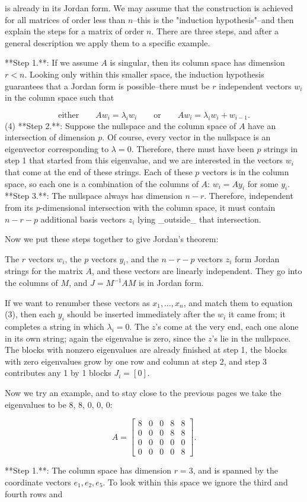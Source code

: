 is already in its Jordan form. We may assume that the construction is achieved for all matrices of order less than \(n\)--this is the "induction hypothesis"--and then explain the steps for a matrix of order \(n\). There are three steps, and after a general description we apply them to a specific example.

**Step 1.**: If we assume \(A\) is singular, then its column space has dimension \(r<n\). Looking only within this smaller space, the induction hypothesis guarantees that a Jordan form is possible--there must be \(r\) independent vectors \(w_{i}\) in the column space such that

\[\text{either}\qquad Aw_{i}=\lambda_{i}w_{i}\qquad\text{or}\qquad Aw_{i}= \lambda_{i}w_{i}+w_{i-1}.\] (4)
**Step 2.**: Suppose the nullspace and the column space of \(A\) have an intersection of dimension \(p\). Of course, every vector in the nullspace is an eigenvector corresponding to \(\lambda=0\). Therefore, there must have been \(p\) strings in step 1 that started from this eigenvalue, and we are interested in the vectors \(w_{i}\) that come at the end of these strings. Each of these \(p\) vectors is in the column space, so each one is a combination of the columns of \(A\): \(w_{i}=Ay_{i}\) for some \(y_{i}\).
**Step 3.**: The nullspace always has dimension \(n-r\). Therefore, independent from its \(p\)-dimensional intersection with the column space, it must contain \(n-r-p\) additional basis vectors \(z_{i}\) lying _outside_ that intersection.

Now we put these steps together to give Jordan's theorem:

The \(r\) vectors \(w_{i}\), the \(p\) vectors \(y_{i}\), and the \(n-r-p\) vectors \(z_{i}\) form Jordan strings for the matrix \(A\), and these vectors are linearly independent. They go into the columns of \(M\), and \(J=M^{-1}AM\) is in Jordan form.

If we want to renumber these vectors as \(x_{1},\ldots,x_{n}\), and match them to equation (3), then each \(y_{i}\) should be inserted immediately after the \(w_{i}\) it came from; it completes a string in which \(\lambda_{i}=0\). The \(z\)'s come at the very end, each one alone in its own string; again the eigenvalue is zero, since the \(z\)'s lie in the nullspace. The blocks with nonzero eigenvalues are already finished at step 1, the blocks with zero eigenvalues grow by one row and column at step 2, and step 3 contributes any 1 by 1 blocks \(J_{i}=[0]\).

Now we try an example, and to stay close to the previous pages we take the eigenvalues to be 8, 8, 0, 0, 0:

\[A=\begin{bmatrix}8&0&0&8&8\\ 0&0&0&8&8\\ 0&0&0&0&0\\ 0&0&0&0&8\end{bmatrix}.\]

**Step 1.**: The column space has dimension \(r=3\), and is spanned by the coordinate vectors \(e_{1},e_{2},e_{5}\). To look within this space we ignore the third and fourth rows and 